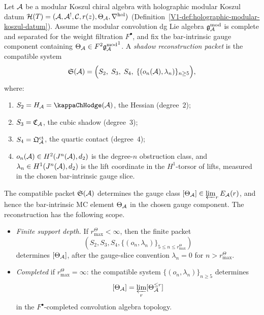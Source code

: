 \begin{theorem}
\label{thm:filtered-shadow-tower-reconstruction}
Let $\mathcal{A}$ be a modular Koszul chiral algebra with
holographic modular Koszul datum
$\mathcal{H}(T) = (\mathcal{A}, \mathcal{A}^!, \mathcal{C}, r(z),
\Theta_{\mathcal{A}}, \nabla^{\mathrm{hol}})$
\textup{(}Definition~\textup{\ref{V1-def:holographic-modular-koszul-datum})}.
Assume the modular convolution dg Lie algebra \(\mathfrak{g}_{\mathcal{A}}^{\mathrm{mod}}\) is complete
and separated for the weight filtration \(F^\bullet\), and fix the
bar-intrinsic gauge component containing
\(\Theta_{\mathcal{A}}\in F^2{\mathfrak{g}_{\mathcal{A}}^{\mathrm{mod}}}^1\).  A \emph{shadow reconstruction packet}
is the compatible system
\[
\mathfrak S(\mathcal{A})=
\Bigl(
S_2,\;S_3,\;S_4,\;
\{(o_n(\mathcal{A}),\lambda_n)\}_{n\geq 5}
\Bigr),
\]
where:
\begin{enumerate}[label=\textup{(\roman*)}]
\item \(S_2=H_\cA=\kappaChHodge(\cA)\), the Hessian
 \textup{(}degree~$2$\textup{)};
\item \(S_3=\mathfrak C_{\mathcal{A}}\), the cubic shadow
 \textup{(}degree~$3$\textup{)};
\item \(S_4=\mathfrak Q^{\mathrm{ct}}_{\mathcal{A}}\), the quartic contact
 \textup{(}degree~$4$\textup{)};
\item \(o_n(\mathcal{A})\in H^2(J^n(\mathcal{A}),d_2)\) is the degree-\(n\)
 obstruction class, and
 \(\lambda_n\in H^1(J^n(\mathcal{A}),d_2)\) is the lift coordinate in the
 \(H^1\)-torsor of lifts, measured in the chosen bar-intrinsic gauge
 slice.
\end{enumerate}
The compatible packet \(\mathfrak S(\mathcal{A})\) determines the gauge class
\([\Theta_{\mathcal{A}}]\in \varprojlim_r E_{\mathcal{A}}(r)\), and hence the
bar-intrinsic MC element \(\Theta_{\mathcal{A}}\) in the chosen gauge component.
The reconstruction has the following scope.
\begin{itemize}
\item \emph{Finite support depth.} If \(r^\Theta_{\max}<\infty\), then the finite
 packet
 \[
 (S_2,S_3,S_4,\{(o_n,\lambda_n)\}_{5\leq n\leq r^\Theta_{\max}})
 \]
 determines \([\Theta_{\mathcal{A}}]\), after the gauge-slice convention
 \(\lambda_n=0\) for \(n>r^\Theta_{\max}\).
\item \emph{Completed} if \(r^\Theta_{\max} = \infty\): the compatible system
 \(\{(o_n,\lambda_n)\}_{n\geq 5}\) determines
 \[
 [\Theta_{\mathcal{A}}]=\varprojlim_r[\Theta_{\mathcal{A}}^{\leq r}]
 \]
 in the \(F^\bullet\)-completed convolution algebra topology.

\end{itemize}
\end{theorem}
